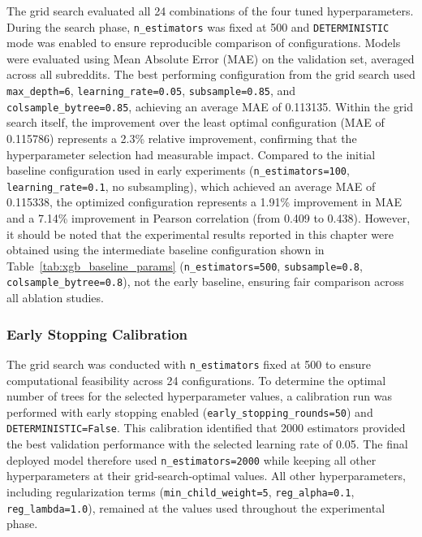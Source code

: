 The grid search evaluated all 24 combinations of the four tuned hyperparameters. During the search phase, \texttt{n\_estimators} was fixed at 500 and \texttt{DETERMINISTIC} mode was enabled to ensure reproducible comparison of configurations. Models were evaluated using Mean Absolute Error (MAE) on the validation set, averaged across all subreddits. The best performing configuration from the grid search used \texttt{max\_depth=6}, \texttt{learning\_rate=0.05}, \texttt{subsample=0.85}, and \texttt{colsample\_bytree=0.85}, achieving an average MAE of 0.113135. Within the grid search itself, the improvement over the least optimal configuration (MAE of 0.115786) represents a 2.3\% relative improvement, confirming that the hyperparameter selection had measurable impact. Compared to the initial baseline configuration used in early experiments (\texttt{n\_estimators=100}, \texttt{learning\_rate=0.1}, no subsampling), which achieved an average MAE of 0.115338, the optimized configuration represents a 1.91\% improvement in MAE and a 7.14\% improvement in Pearson correlation (from 0.409 to 0.438). However, it should be noted that the experimental results reported in this chapter were obtained using the intermediate baseline configuration shown in Table~\ref{tab:xgb_baseline_params} (\texttt{n\_estimators=500}, \texttt{subsample=0.8}, \texttt{colsample\_bytree=0.8}), not the early baseline, ensuring fair comparison across all ablation studies.

\subsubsection*{Early Stopping Calibration}

The grid search was conducted with \texttt{n\_estimators} fixed at 500 to ensure computational feasibility across 24 configurations. To determine the optimal number of trees for the selected hyperparameter values, a calibration run was performed with early stopping enabled (\texttt{early\_stopping\_rounds=50}) and \texttt{DETERMINISTIC=False}. This calibration identified that 2000 estimators provided the best validation performance with the selected learning rate of 0.05. The final deployed model therefore used \texttt{n\_estimators=2000} while keeping all other hyperparameters at their grid-search-optimal values. All other hyperparameters, including regularization terms (\texttt{min\_child\_weight=5}, \texttt{reg\_alpha=0.1}, \texttt{reg\_lambda=1.0}), remained at the values used throughout the experimental phase.



